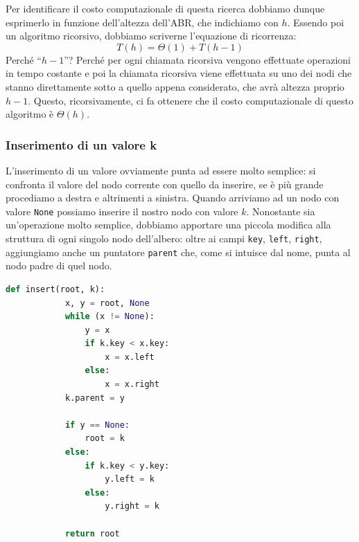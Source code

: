 \documentclass[12pt]{report}
\begin{document}
	Per identificare il costo computazionale di questa ricerca dobbiamo dunque esprimerlo in funzione dell'altezza dell'ABR, che indichiamo con $h$. Essendo poi un algoritmo ricorsivo, dobbiamo scriverne l'equazione di ricorrenza: 
	\[
	T(h) = \Theta(1) + T(h-1)
	\]
	Perché ``$h-1$''? Perché per ogni chiamata ricorsiva vengono effettuate operazioni in tempo costante e poi la chiamata ricorsiva viene effettuata su uno dei nodi che stanno direttamente sotto a quello appena considerato, che avrà altezza proprio $h-1$. Questo, ricorsivamente, ci fa ottenere che il costo computazionale di questo algoritmo è $\Theta(h)$.
	
	\subsubsection*{Inserimento di un valore k}
	L'inserimento di un valore ovviamente punta ad essere molto semplice: si confronta il valore del nodo corrente con quello da inserire, se è più grande procediamo a destra e altrimenti a sinistra. Quando arriviamo ad un nodo con valore \texttt{None} possiamo inserire il nostro nodo con valore $k$. Nonostante sia un'operazione molto semplice, dobbiamo apportare una piccola modifica alla struttura di ogni singolo nodo dell'albero: oltre ai campi \texttt{key}, \texttt{left}, \texttt{right}, aggiungiamo anche un puntatore \texttt{parent} che, come si intuisce dal nome, punta al nodo padre di quel nodo.
	
	\begin{lstlisting}[language=Python, caption={Inserimento di un valore in un ABR}]
		def insert(root, k):
			x, y = root, None
			while (x != None):
				y = x
				if k.key < x.key:
					x = x.left
				else:
					x = x.right
			k.parent = y
			
			if y == None:
				root = k
			else:
				if k.key < y.key:
					y.left = k
				else:
					y.right = k
					
			return root
			
	\end{lstlisting}
	
\end{document}
